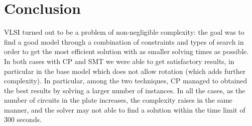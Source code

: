 \section{Conclusion}

VLSI turned out to be a problem of non-negligible complexity: the goal was to find a good model through a combination of constraints and types of search in order to get the most efficient solution with as smaller solving times as possible. \\
In both cases with CP and SMT we were able to get satisfactory results, in particular in the base model which does not allow rotation (which adds further complexity). In particular, among the two techniques, CP managed to obtained the best results by solving a larger number of instances. In all the cases, as the number of circuits in the plate increases, the complexity raises in the same manner, and the solver may not able to find a solution within the time limit of 300 seconds.